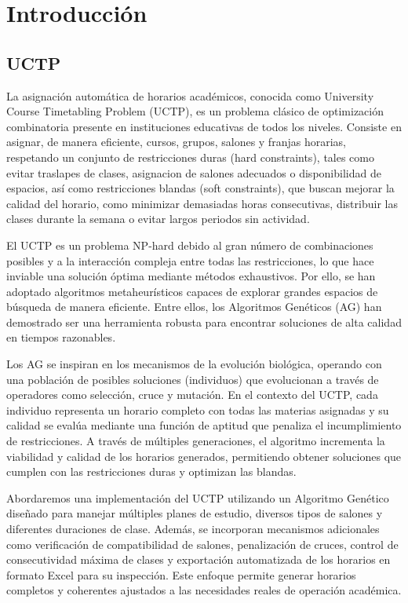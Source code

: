 \section{Introducción}
\subsection{UCTP}
La asignación automática de horarios académicos, conocida como University Course Timetabling Problem (UCTP), es un problema clásico de optimización combinatoria 
presente en instituciones educativas de todos los niveles. Consiste en asignar, de manera eficiente, cursos, grupos, salones y franjas horarias, respetando un 
conjunto de restricciones duras (hard constraints), tales como evitar traslapes de clases, asignacion de salones adecuados o disponibilidad de espacios, así como 
restricciones blandas (soft constraints), que buscan mejorar la calidad del horario, como minimizar demasiadas horas consecutivas, distribuir las clases durante la semana 
o evitar largos periodos sin actividad.

El UCTP es un problema NP-hard debido al gran número de combinaciones posibles y a la interacción compleja entre todas las restricciones, lo que hace inviable una solución 
óptima mediante métodos exhaustivos. Por ello, se han adoptado algoritmos metaheurísticos capaces de explorar grandes espacios de búsqueda de manera eficiente. 
Entre ellos, los Algoritmos Genéticos (AG) han demostrado ser una herramienta robusta para encontrar soluciones de alta calidad en tiempos razonables.

Los AG se inspiran en los mecanismos de la evolución biológica, operando con una población de posibles soluciones (individuos) que evolucionan a través de operadores 
como selección, cruce y mutación. En el contexto del UCTP, cada individuo representa un horario completo con todas las materias asignadas y su calidad se evalúa mediante 
una función de aptitud que penaliza el incumplimiento de restricciones. A través de múltiples generaciones, el algoritmo incrementa la viabilidad y calidad de los 
horarios generados, permitiendo obtener soluciones que cumplen con las restricciones duras y optimizan las blandas.

Abordaremos una implementación del UCTP utilizando un Algoritmo Genético diseñado para manejar múltiples planes de estudio, diversos tipos de salones y 
diferentes duraciones de clase. Además, se incorporan mecanismos adicionales como verificación de compatibilidad de salones, penalización de cruces, 
control de consecutividad máxima de clases y exportación automatizada de los horarios en formato Excel para su inspección. Este enfoque permite generar horarios 
completos y coherentes ajustados a las necesidades reales de operación académica.

